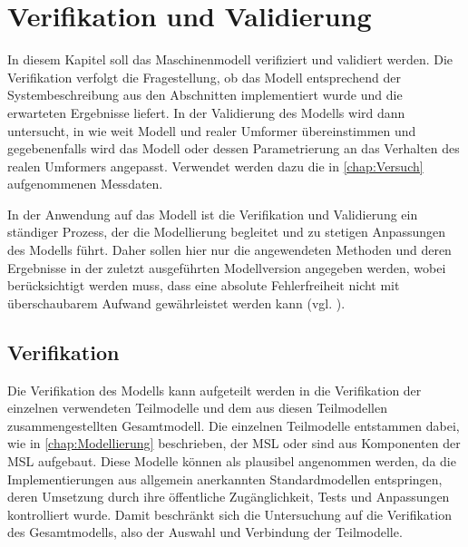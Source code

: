 \chapter{Verifikation und Validierung}
\label{chap:VerfikationValidierung}
In diesem Kapitel soll das Maschinenmodell verifiziert und validiert werden. Die Verifikation verfolgt die Fragestellung, ob das Modell entsprechend der Systembeschreibung aus den Abschnitten  implementiert wurde und die erwarteten Ergebnisse liefert. In der Validierung des Modells wird dann untersucht, in wie weit Modell und realer Umformer übereinstimmen und gegebenenfalls wird das Modell oder dessen Parametrierung an das Verhalten des realen Umformers angepasst. Verwendet werden dazu die in \cref{chap:Versuch} aufgenommenen Messdaten. 

In der Anwendung auf das Modell ist die Verifikation und Validierung ein ständiger Prozess, der die Modellierung begleitet und zu stetigen Anpassungen des Modells führt. Daher sollen hier nur die angewendeten Methoden und deren Ergebnisse in der zuletzt ausgeführten Modellversion angegeben werden, wobei berücksichtigt werden muss, dass eine absolute Fehlerfreiheit nicht mit überschaubarem Aufwand gewährleistet werden kann (vgl. \cite[S.~14ff.]{rabeVerifikationUndValidierung2008}).
 
\section{Verifikation}
\label{sec:Verifkation}
Die Verifikation des Modells kann aufgeteilt werden in die Verifikation der einzelnen verwendeten Teilmodelle und dem aus diesen Teilmodellen zusammengestellten Gesamtmodell. Die einzelnen Teilmodelle entstammen dabei, wie in \cref{chap:Modellierung} beschrieben, der MSL oder sind aus Komponenten der MSL aufgebaut. Diese Modelle können als plausibel angenommen werden, da die Implementierungen aus allgemein anerkannten Standardmodellen entspringen, deren Umsetzung durch ihre öffentliche Zugänglichkeit, Tests und Anpassungen kontrolliert wurde. Damit beschränkt sich die Untersuchung auf die Verifikation des Gesamtmodells, also der Auswahl und Verbindung der Teilmodelle. 

